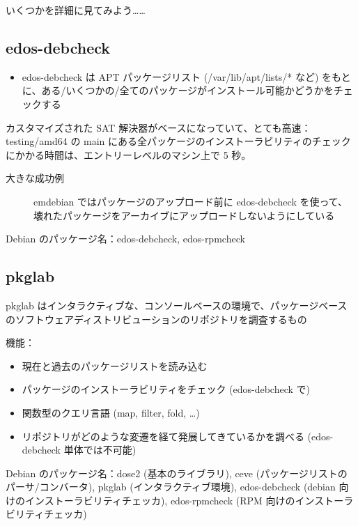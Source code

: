 \documentclass[mingoth,a4paper]{jsarticle}
\begin{document}
いくつかを詳細に見てみよう……


\subsection{edos-debcheck}

\begin{itemize}
\item edos-debcheck は APT パッケージリスト (/var/lib/apt/lists/* など) をもとに、ある/いくつかの/全てのパッケージがインストール可能かどうかをチェックする
\end{itemize}

カスタマイズされた SAT 解決器がベースになっていて、とても高速：testing/amd64 の main にある全パッケージのインストーラビリティのチェックにかかる時間は、エントリーレベルのマシン上で 5 秒。

\begin{description}
\item[大きな成功例] \mbox{}

emdebian ではパッケージのアップロード前に edos-debcheck を使って、壊れたパッケージをアーカイブにアップロードしないようにしている
\end{description}

Debian のパッケージ名：edos-debcheck, edos-rpmcheck


\subsection{pkglab}

pkglab はインタラクティブな、コンソールベースの環境で、パッケージベースのソフトウェアディストリビューションのリポジトリを調査するもの

機能：

\begin{itemize}
\item 現在と過去のパッケージリストを読み込む
\item パッケージのインストーラビリティをチェック (edos-debcheck で)
\item 関数型のクエリ言語 (map, filter, fold, \dots{})
\item リポジトリがどのような変遷を経て発展してきているかを調べる (edos-debcheck 単体では不可能)
\end{itemize}

Debian のパッケージ名：dose2 (基本のライブラリ), ceve (パッケージリストのパーサ/コンバータ), pkglab (インタラクティブ環境), edos-debcheck (debian 向けのインストーラビリティチェッカ), edos-rpmcheck (RPM 向けのインストーラビリティチェッカ)
\end{document}
